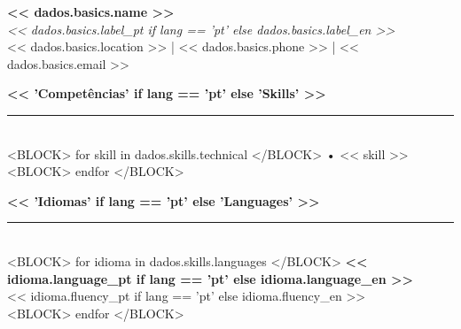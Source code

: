 \documentclass[10pt,a4paper]{article}
\begin{document}
\begin{center}
    {\Huge \textbf{\color{primarycolor}<< dados.basics.name >>}} \\
    \vspace{1mm}
    {\large \textit{<< dados.basics.label_pt if lang == 'pt' else dados.basics.label_en >>}} \\
    \vspace{2mm}
    \small << dados.basics.location >> | << dados.basics.phone >> | << dados.basics.email >>
\end{center}

\vspace{4mm}

\begin{minipage}[t]{0.33\textwidth}
    \raggedright
    
    {\color{primarycolor}\large \textbf{<< 'Competências' if lang == 'pt' else 'Skills' >>}} \\
    \rule{\linewidth}{0.5pt} \\
    \vspace{1mm}
    <BLOCK> for skill in dados.skills.technical </BLOCK>
        • << skill >> \\
    <BLOCK> endfor </BLOCK>
    
    \vspace{5mm}
    
    {\color{primarycolor}\large \textbf{<< 'Idiomas' if lang == 'pt' else 'Languages' >>}} \\
    \rule{\linewidth}{0.5pt} \\
    \vspace{1mm}
    <BLOCK> for idioma in dados.skills.languages </BLOCK>
        \textbf{<< idioma.language_pt if lang == 'pt' else idioma.language_en >>} \\
        \small << idioma.fluency_pt if lang == 'pt' else idioma.fluency_en >> \\
        \vspace{1mm}
    <BLOCK> endfor </BLOCK>
\end{minipage}
\hfill
\begin{minipage}[t]{0.02\textwidth}
    \hfill
\end{minipage}
\hfill
\end{document}
